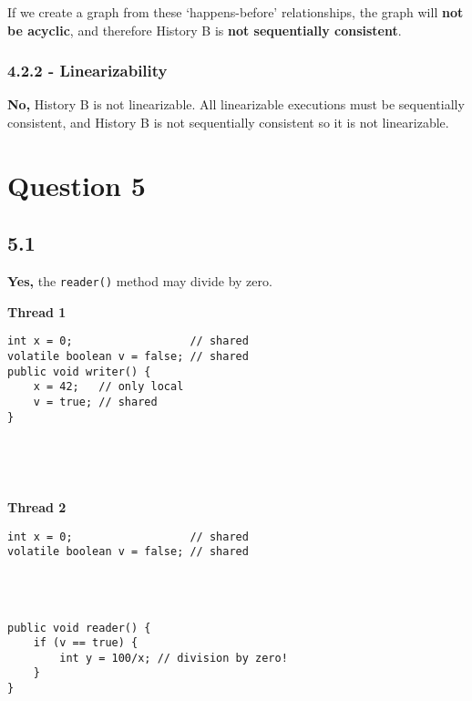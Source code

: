 \documentclass[11pt, letterpaper]{article}
\newcommand{\code}[1] { \texttt{#1} }
\begin{document}
If we create a graph from these `happens-before' relationships, the graph will \textbf{not be acyclic}, and therefore History B is \textbf{not sequentially consistent}.

\subsubsection*{4.2.2 - Linearizability}
\label{ssub:4_2_2_linearizability}

\textbf{No,} History B is not linearizable. All linearizable executions must be sequentially consistent, and History B is not sequentially consistent so it is not linearizable.

\newpage
\section*{Question 5}
\label{sec:question_5}

\subsection*{5.1}
\label{sub:5_1}

\textbf{Yes,} the \code{reader()} method may divide by zero.

\begin{figure*}[h!]
    \begin{minipage}{0.5\textwidth}
        \centering
        \textbf{Thread 1}
        \begin{verbatim}
int x = 0;                  // shared
volatile boolean v = false; // shared
public void writer() {
    x = 42;   // only local
    v = true; // shared
}





        \end{verbatim}
    \end{minipage}
    \begin{minipage}{0.5\textwidth}
        \centering
        \textbf{Thread 2}
        \begin{verbatim}
int x = 0;                  // shared
volatile boolean v = false; // shared




public void reader() {
    if (v == true) {
        int y = 100/x; // division by zero!
    }
}
        \end{verbatim}
    \end{minipage}
\end{figure*}
\end{document}
